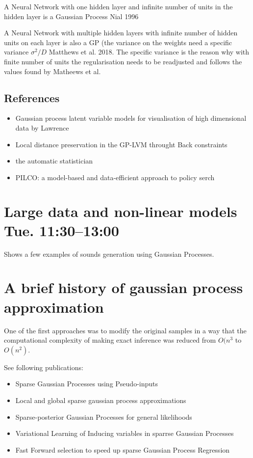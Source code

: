 \documentclass[b5paper]{report}
\begin{document}
A Neural Network with one hidden layer and infinite number of units in the
hidden layer is a Gaussian Process Nial 1996

A Neural Network  with multiple hidden layers with infinite number of hidden
units on each layer is also a GP (the variance on the weights need a specific
  variance $\sigma^2/D$ Matthews et al. 2018. The specific variance is the
  reason why with finite number of units the regularisation needs to be
  readjusted and follows the values found by Matheews et al.

\subsection{References}

\begin{itemize}
  \item Gaussian process latent variable models for visualisation of high
    dimensional data by Lawrence
  \item Local distance preservation in the GP-LVM throught Back constraints
  \item the automatic statistician
  \item PILCO: a model-based and data-efficient approach to policy serch
\end{itemize}

\section{Large data and non-linear models Tue. 11:30--13:00}

Shows a few examples of sounds generation using Gaussian Processes.

\section{A brief history of gaussian process approximation}

One of the first approaches was to modify the original samples in a way that
the computational complexity of making exact inference was reduced from $O(n^3$
to $O(n^2)$.

See following publications:

\begin{itemize}
  \item Sparse Gaussian Processes using Pseudo-inputs
  \item Local and global sparse gaussian process approximations
  \item Sparse-posterior Gaussian Processes for general likelihoods
  \item Variational Learning of Inducing variables in sparrse Gaussian
    Processes
  \item Fast Forward selection to speed up sparse Gaussian Process Regression
\end{itemize}
\end{document}
